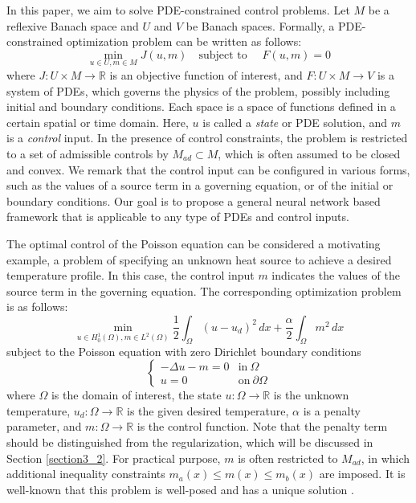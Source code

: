 \documentclass[letterpaper]{article}
\begin{document}
In this paper, we aim to solve PDE-constrained control problems. Let $M$ be a reflexive Banach space and $U$ and $V$ be Banach spaces. Formally, a PDE-constrained optimization problem can be written as follows:
\begin{equation}
    \min_{u \in U, m \in M} J(u, m) \quad \text{subject to } \quad F(u, m) = 0
\end{equation}
where $J: U \times M \rightarrow \mathbb{R}$ is an objective function of interest, and $F: U \times M \rightarrow V$ is a system of PDEs, which governs the physics of the problem, possibly including initial and boundary conditions. Each space is a space of functions defined in a certain spatial or time domain. Here, $u$ is called a \textit{state} or PDE solution, and $m$ is a \textit{control} input. In the presence of control constraints, the problem is restricted to a set of admissible controls by $M_{ad} \subset M$, which is often assumed to be closed and convex. We remark that the control input can be configured in various forms, such as the values of a source term in a governing equation, or of the initial or boundary conditions. Our goal is to propose a general neural network based framework that is applicable to any type of PDEs and control inputs.

The optimal control of the Poisson equation can be considered a motivating example, a problem of specifying an unknown heat source to achieve a desired temperature profile. In this case, the control input $m$ indicates the values of the source term in the governing equation. The corresponding optimization problem is as follows:
\begin{equation}\label{poisson_control_objective}
  \min_{u \in H_0^1(\Omega), m \in L^2(\Omega)} \frac{1}{2}\int_{\Omega} (u-u_d)^2 \, dx  + \frac{\alpha}{2} \int_\Omega m^2 \, dx
\end{equation}
subject to the Poisson equation with zero Dirichlet boundary conditions
\begin{equation}\label{poisson_equation}
    \begin{cases}
    - \Delta u - m = 0 &\text{in}\ \Omega \\
    u = 0 &\text{on}\ \partial \Omega
  \end{cases}
\end{equation}
where $\Omega$ is the domain of interest, the state $u: \Omega \rightarrow \mathbb{R}$ is the unknown temperature, $u_d: \Omega \rightarrow \mathbb{R}$ is the given desired temperature, $\alpha$ is a penalty parameter, and $m: \Omega \rightarrow \mathbb{R}$ is the control function. Note that the penalty term should be distinguished from the regularization, which will be discussed in Section \ref{section3_2}. For practical purpose, $m$ is often restricted to $M_{ad}$, in which additional inequality constraints $m_a(x) \leq m(x) \leq m_b(x)$ are imposed. It is well-known that this problem is well-posed and has a unique solution \cite{hinze2008optimization, troltzsch2010optimal}.
\end{document}

